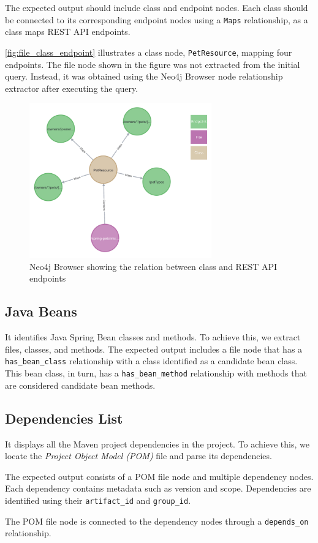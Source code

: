 The expected output should include class and endpoint nodes. Each class should be connected to its corresponding endpoint nodes using a \texttt{Maps} relationship, as a class maps REST API endpoints.

\autoref{fig:file_class_endpoint} illustrates a class node, \texttt{PetResource}, mapping four endpoints. The file node shown in the figure was not extracted from the initial query. Instead, it was obtained using the Neo4j Browser node relationship extractor after executing the query.

\begin{figure}[H]
    \centering
    \includegraphics[width=0.7\textwidth]{figures/file_class_endpoint.png}
    \caption{Neo4j Browser showing the relation between class and REST API endpoints}
    \label{fig:file_class_endpoint}
\end{figure}

\subsection{Java Beans}
It identifies Java Spring Bean classes and methods. To achieve this, we extract files, classes, and methods. The expected output includes a file node that has a \texttt{has\_bean\_class} relationship with a class identified as a candidate bean class. This bean class, in turn, has a \texttt{has\_bean\_method} relationship with methods that are considered candidate bean methods.

\subsection{Dependencies List}
It displays all the Maven project dependencies in the project. To achieve this, we locate the \textit{Project Object Model (POM)} file and parse its dependencies.

The expected output consists of a POM file node and multiple dependency nodes. Each dependency contains metadata such as version and scope. Dependencies are identified using their \texttt{artifact\_id} and \texttt{group\_id}.

The POM file node is connected to the dependency nodes through a \texttt{depends\_on} relationship.